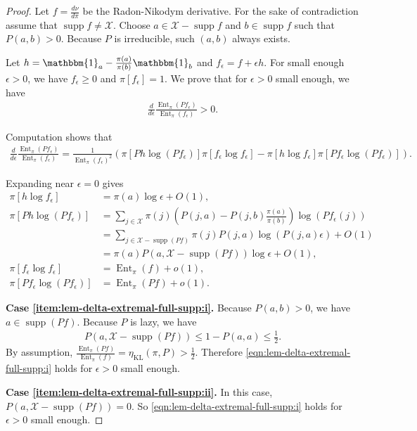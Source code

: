 \documentclass[11pt]{article}
\def\cX{\mathcal{X}}
\DeclareMathOperator\supp{\mathrm{supp}}
\DeclareMathOperator\Ent{\mathrm{Ent}}
\DeclareMathOperator\KL{\mathrm{KL}}
\theoremstyle{definition}
\begin{document}
\begin{proof}

  Let $f = \frac{d\nu}{d\pi}$ be the Radon-Nikodym derivative.
  For the sake of contradiction assume that $\supp f \ne \cX$.
  Choose $a\in \cX - \supp f$ and $b\in \supp f$ such that $P(a,b) > 0$.
  Because $P$ is irreducible, such $(a,b)$ always exists.

  Let $h = \mathbbm{1}_a - \frac{\pi(a)}{\pi(b)}\mathbbm{1}_b$ and $f_\epsilon = f + \epsilon h$.
  For small enough $\epsilon>0$, we have $f_\epsilon\ge 0$ and $\pi[f_\epsilon]=1$.
  We prove that for $\epsilon > 0$ small enough, we have
  \begin{align} \label{eqn:lem-delta-extremal-full-supp:i}
  \frac{d}{d \epsilon} \frac{\Ent_\pi(P f_\epsilon)}{\Ent_\pi(f_\epsilon)} > 0.
  \end{align}

  Computation shows that
  \begin{align}
  \frac{d}{d \epsilon} \frac{\Ent_\pi(P f_\epsilon)}{\Ent_\pi(f_\epsilon)}
  = \frac 1{\Ent_\pi(f_\epsilon)^2} \left(\pi[Ph\log (P f_\epsilon)] \pi[f_\epsilon \log f_\epsilon] - \pi[h \log f_\epsilon] \pi[Pf_\epsilon \log (P f_\epsilon)]\right).
  \end{align}

  Expanding near $\epsilon=0$ gives
  \begin{align}
  \pi[h \log f_\epsilon] &= \pi(a) \log \epsilon + O(1),\\
  \pi[P h \log (P f_\epsilon)] &= \sum_{j\in \cX} \pi(j) \left(P(j,a)-P(j,b) \frac{\pi(a)}{\pi(b)}\right) \log (P f_\epsilon(j)) \\
  \nonumber &=\sum_{j\in \cX - \supp (P f)} \pi(j) P(j,a) \log (P(j,a) \epsilon) + O(1) \\
  \nonumber &=\pi(a) P(a, \cX - \supp(P f)) \log \epsilon + O(1),\\
  \pi[f_\epsilon \log f_\epsilon] &= \Ent_\pi(f) + o(1),\\
  \pi[P f_\epsilon \log (P f_\epsilon)] &= \Ent_\pi(P f) + o(1).
  \end{align}

  \textbf{Case \cref{item:lem-delta-extremal-full-supp:i}.}
  Because $P(a, b) > 0$, we have $a\in \supp(P f)$.
  Because $P$ is lazy, we have
  \begin{align}
    P(a, \cX - \supp(P f)) \le 1-P(a, a) \le \frac 12.
  \end{align}
  By assumption, $\frac{\Ent_\pi(P f)}{\Ent_\pi(f)} = \eta_{\KL}(\pi, P) > \frac12$.
  Therefore \cref{eqn:lem-delta-extremal-full-supp:i} holds for $\epsilon>0$ small enough.

  \textbf{Case \cref{item:lem-delta-extremal-full-supp:ii}.}
  In this case, $P(a, \cX - \supp(P f)) = 0$. So \cref{eqn:lem-delta-extremal-full-supp:i} holds for $\epsilon>0$ small enough.
\end{proof}
\end{document}
